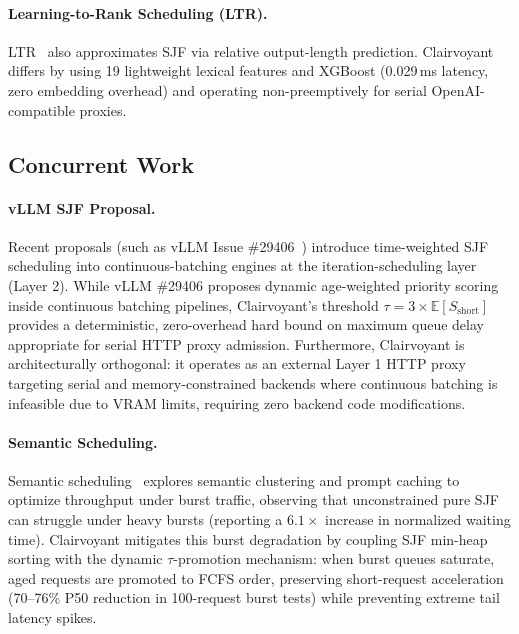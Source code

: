 \documentclass[10pt]{article}
\begin{document}
\paragraph{Learning-to-Rank Scheduling (LTR).}
LTR~\cite{fu2024efficient} also approximates SJF via relative output-length prediction. Clairvoyant differs by using 19 lightweight lexical features and XGBoost (0.029\,ms latency, zero embedding overhead) and operating non-preemptively for serial OpenAI-compatible proxies.

\subsection{Concurrent Work}
\label{sec:concurrent}

\paragraph{vLLM SJF Proposal.}
Recent proposals (such as vLLM Issue \#29406~\cite{vllm_sjf_2025}) introduce time-weighted SJF scheduling into continuous-batching engines at the iteration-scheduling layer (Layer 2). While vLLM \#29406 proposes dynamic age-weighted priority scoring inside continuous batching pipelines, Clairvoyant's threshold $\tau = 3 \times \mathbb{E}[S_{\text{short}}]$ provides a deterministic, zero-overhead hard bound on maximum queue delay appropriate for serial HTTP proxy admission. Furthermore, Clairvoyant is architecturally orthogonal: it operates as an external Layer 1 HTTP proxy targeting serial and memory-constrained backends where continuous batching is infeasible due to VRAM limits, requiring zero backend code modifications.

\paragraph{Semantic Scheduling.}
Semantic scheduling~\cite{zhang2025semantic} explores semantic clustering and prompt caching to optimize throughput under burst traffic, observing that unconstrained pure SJF can struggle under heavy bursts (reporting a $6.1\times$ increase in normalized waiting time). Clairvoyant mitigates this burst degradation by coupling SJF min-heap sorting with the dynamic $\tau$-promotion mechanism: when burst queues saturate, aged requests are promoted to FCFS order, preserving short-request acceleration (70–76\% P50 reduction in 100-request burst tests) while preventing extreme tail latency spikes.

\end{document}
